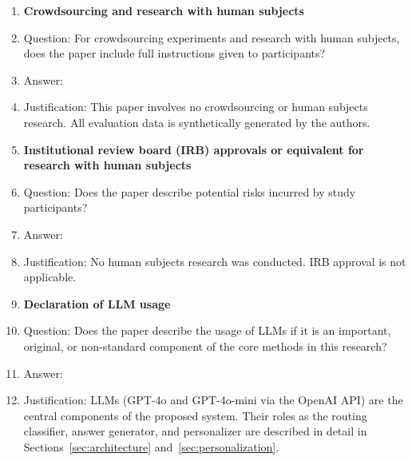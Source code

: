 \begin{enumerate}
\item {\bf Crowdsourcing and research with human subjects}
    \item[] Question: For crowdsourcing experiments and research with human subjects, does the paper include full instructions given to participants?
    \item[] Answer: \answerNA{}
    \item[] Justification: This paper involves no crowdsourcing or human subjects research. All evaluation data is synthetically generated by the authors.

\item {\bf Institutional review board (IRB) approvals or equivalent for research with human subjects}
    \item[] Question: Does the paper describe potential risks incurred by study participants?
    \item[] Answer: \answerNA{}
    \item[] Justification: No human subjects research was conducted. IRB approval is not applicable.

\item {\bf Declaration of LLM usage}
    \item[] Question: Does the paper describe the usage of LLMs if it is an important, original, or non-standard component of the core methods in this research?
    \item[] Answer: \answerYes{}
    \item[] Justification: LLMs (GPT-4o and GPT-4o-mini via the OpenAI API) are the central components of the proposed system. Their roles as the routing classifier, answer generator, and personalizer are described in detail in Sections~\ref{sec:architecture} and~\ref{sec:personalization}.

\end{enumerate}

